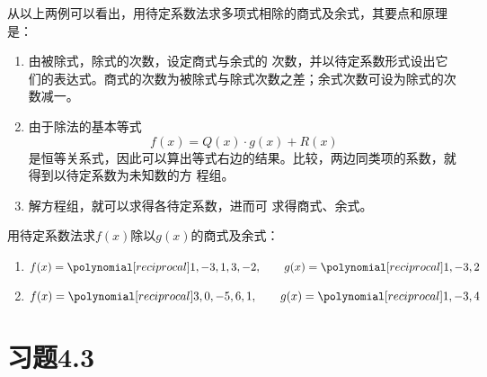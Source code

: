 从以上两例可以看出，用待定系数法求多项式相除的商式及余式，其要点和原理是：
\begin{enumerate}
    \item 由被除式，除式的次数，设定商式与余式的
次数，并以待定系数形式设出它们的表达式。商式的次数为被除式与除式次数之差；余式次数可设为除式的次数减一。
\item 由于除法的基本等式
\[f (x) =Q (x) \cdot g (x) +R (x)\]
是恒等关系式，因此可以算出等式右边的结果。比较，两边同类项的系数，就得到以待定系数为未知数的方
程组。
\item 解方程组，就可以求得各待定系数，进而可
求得商式、余式。
\end{enumerate}

\begin{ex}
    用待定系数法求$f(x)$除以$g(x)$的商式及余式：
    \begin{enumerate}
        \item $f(x)=\poly{1,-3,1,3,-2},\qquad g(x)=\poly{1,-3,2}$
        \item $f(x)=\poly{3,0,-5,6, 1},\qquad g(x)=\poly{1,-3,4}$
    \end{enumerate}
\end{ex}

\section*{习题4.3}

